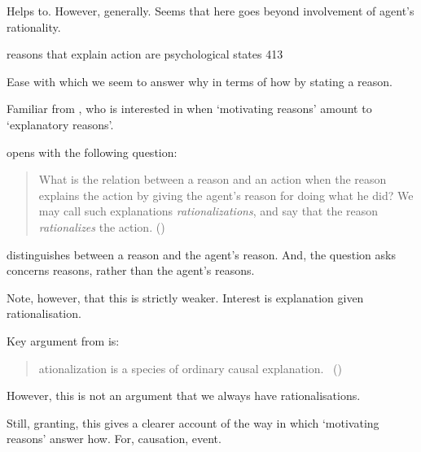 \begin{note}
  Helps to.
  However, generally.
  Seems that here \citeauthor{Broome:2013aa} goes beyond involvement of agent's rationality.

  \citeauthor{Hieronymi:2011aa}
  reasons that explain action are psychological states 413

  Ease with which we seem to answer why in terms of how by stating a reason.
\end{note}

\begin{note}
  Familiar from \citeauthor{Davidson:1963aa}, who is interested in when `motivating reasons' amount to `explanatory reasons'.

  \citeauthor{Davidson:1963aa} opens  with the following question:

  \begin{quote}
    What is the relation between a reason and an action when the reason explains the action by giving the agent's reason for doing what he did?
    We may call such explanations \emph{rationalizations}, and say that the reason \emph{rationalizes} the action.%
    \mbox{}\hfill\mbox{(\citeyear[685]{Davidson:1963aa})}
  \end{quote}

  \citeauthor{Davidson:1963aa} distinguishes between a reason and the agent's reason.
  And, the question \citeauthor{Davidson:1963aa} asks concerns reasons, rather than the agent's reasons.

  Note, however, that this is strictly weaker.
  Interest is explanation given rationalisation.

  Key argument from \citeauthor{Davidson:1963aa} is:

  \begin{quote}
    \begin{enumerate}[label=\arabic*]
      [R]ationalization is a species of ordinary causal explanation.\newline
      \mbox{ }\hfill\mbox{(\citeyear[685]{Davidson:1963aa})}
    \end{enumerate}
  \end{quote}

  However, this is not an argument that we always have rationalisations.

  Still, granting, this gives a clearer account of the way in which `motivating reasons' answer how.
  For, causation, event.
\end{note}

